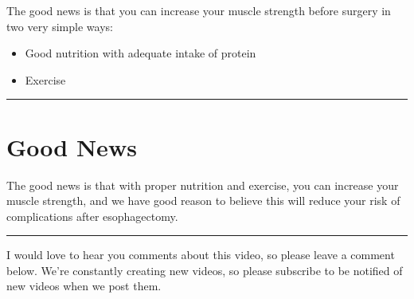 \documentclass[
]{article}
\begin{document}
The good news is that you can increase your muscle strength before
surgery in two very simple ways:

\begin{itemize}
\item
  Good nutrition with adequate intake of protein
\item
  Exercise
\end{itemize}

\begin{center}\rule{0.5\linewidth}{0.5pt}\end{center}

\hypertarget{good-news}{%
\section{Good News}\label{good-news}}

The good news is that with proper nutrition and exercise, you can
increase your muscle strength, and we have good reason to believe this
will reduce your risk of complications after esophagectomy.

\begin{center}\rule{0.5\linewidth}{0.5pt}\end{center}

I would love to hear you comments about this video, so please leave a
comment below. We're constantly creating new videos, so please subscribe
to be notified of new videos when we post them.
\end{document}
